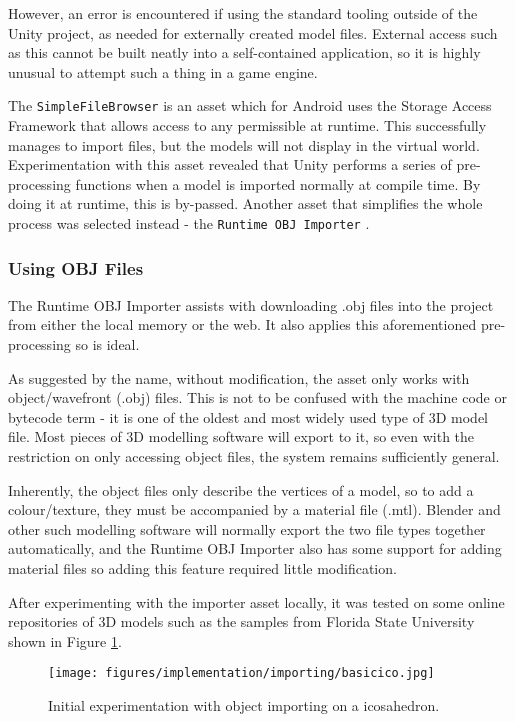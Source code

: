 \documentclass[12pt, a4paper]{article}
\begin{document}
However, an error is encountered if using the standard tooling outside of the Unity project, as needed for externally created model files. External access such as this cannot be built neatly into a self-contained application, so it is highly unusual to attempt such a thing in a game engine. 

The \verb|SimpleFileBrowser| is an asset which for Android uses the Storage Access Framework that allows access to any permissible at runtime. This successfully manages to import files, but the models will not display in the virtual world. Experimentation with this asset revealed that Unity performs a series of pre-processing functions when a model is imported normally at compile time. By doing it at runtime, this is by-passed. Another asset that simplifies the whole process was selected instead - the \verb|Runtime OBJ Importer| \cite{models:objimporter}.

\subsubsection{Using OBJ Files}
The Runtime OBJ Importer assists with downloading .obj files into the project from either the local memory or the web. It also applies this aforementioned pre-processing so is ideal. 

As suggested by the name, without modification, the asset only works with object/wavefront (.obj) files. This is not to be confused with the machine code or bytecode term - it is one of the oldest and most widely used type of 3D model file. Most pieces of 3D modelling software will export to it, so even with the restriction on only accessing object files, the system remains sufficiently general.

Inherently, the object files only describe the vertices of a model, so to add a colour/texture, they must be accompanied by a material file (.mtl). Blender and other such modelling software will normally export the two file types together automatically, and the Runtime OBJ Importer also has some support for adding material files so adding this feature required little modification.

After experimenting with the importer asset locally, it was tested on some online repositories of 3D models such as the samples from Florida State University \cite{models:samplemodels} shown in Figure \ref{fig:basicico}.

\begin{figure}[h]
    \centering
    \texttt{[image: figures/implementation/importing/basicico.jpg]}
        \caption{Initial experimentation with object importing on a icosahedron.}
        \label{fig:basicico}
\end{figure}
\end{document}
